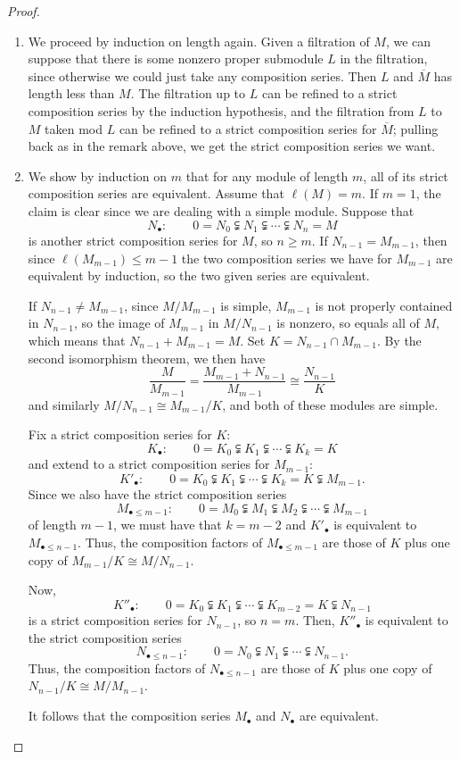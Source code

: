\documentclass{amsart}[12pt]
\numberwithin{equation}{section}
\theoremstyle{plain} %
\theoremstyle{definition}
\theoremstyle{remark}
\begin{document}
\begin{proof}
\begin{enumerate}
		 
	\item We proceed by induction on length again. Given a filtration of $M$, we can suppose that there is some nonzero proper submodule $L$ in the filtration, since otherwise we could just take any composition series. Then $L$ and $\overline{M}$ has length less than $M$. The filtration up to $L$ can be refined to a strict composition series by the induction hypothesis, and the filtration from $L$ to $M$ taken mod $L$ can be refined to a strict composition series for $\overline{M}$; pulling back as in the remark above, we get the strict composition series we want.
	
	
	\item We show by induction on $m$ that for any module of length $m$, all of its strict composition series are equivalent.
	Assume that $\ell(M)=m$. If $m=1$, the claim is clear since we are dealing with a simple module.
	Suppose that
	$$N_\bullet: \qquad 0 = N_0 \subsetneqq N_1 \subsetneqq \cdots \subsetneqq N_n = M$$
	is another strict composition series for $M$, so $n\geq m$. If $N_{n-1}=M_{m-1}$, then since $\ell(M_{m-1})\leq m-1$ the two composition series we have for $M_{m-1}$ are equivalent by induction, so the two given series are equivalent. 
	
	If $N_{n-1} \neq M_{m-1}$, since $M/M_{m-1}$ is simple, $M_{m-1}$ is not properly contained in $N_{n-1}$, so the image of $M_{m-1}$ in $M/N_{n-1}$ is nonzero, so equals all of $M$, which means that  $N_{n-1}+M_{m-1} = M$. Set $K=N_{n-1}\cap M_{m-1}$. By the second isomorphism theorem, we then have
	\[\frac{M}{M_{m-1}} = \frac{M_{m-1}+N_{n-1}}{M_{m-1}} \cong \frac{N_{n-1}}{K}\]
	and similarly $M/N_{n-1} \cong M_{m-1} / K$, and both of these modules are simple.
	
	
	Fix a strict composition series for $K$:
$$K_{\bullet}: \qquad 0 = K_0 \subsetneqq K_1 \subsetneqq \cdots \subsetneqq K_k = K$$
and extend to a strict composition series for $M_{m-1}$:
$$K'_{\bullet}: \qquad 0 = K_0 \subsetneqq K_1 \subsetneqq \cdots \subsetneqq K_k = K \subsetneqq M_{m-1}.$$
Since we also have the strict composition series 
$$M_{\bullet \leq m-1} : \qquad 0 = M_0 \subsetneqq M_1 \subsetneqq M_2 \subsetneqq \cdots \subsetneqq M_{m-1}$$
of length $m-1$, we must have that $k=m-2$ and $K'_{\bullet}$ is equivalent to $M_{\bullet \leq n-1}$. Thus, the composition factors of $M_{\bullet \leq m-1}$ are those of $K$ plus one copy of $M_{m-1} / K \cong M/N_{n-1}$.

 Now, 
$$K''_{\bullet}: \qquad  0 = K_0 \subsetneqq K_1 \subsetneqq \cdots \subsetneqq K_{m-2} = K \subsetneqq N_{n-1}$$
is a strict composition series for $N_{n-1}$, so $n=m$. Then, $K''_{\bullet}$ is equivalent to the strict composition series 
	$$N_{\bullet \leq n-1}: \qquad 0 = N_0 \subsetneqq N_1 \subsetneqq \cdots \subsetneqq N_{n-1}.$$
Thus, the composition factors of $N_{\bullet \leq n-1}$ are those of $K$ plus one copy of $N_{n-1} / K \cong M/M_{n-1}$.

It follows that the composition series $M_\bullet$ and $N_\bullet$ are equivalent.	\qedhere
	\end{enumerate}
\end{proof}
\end{document}
